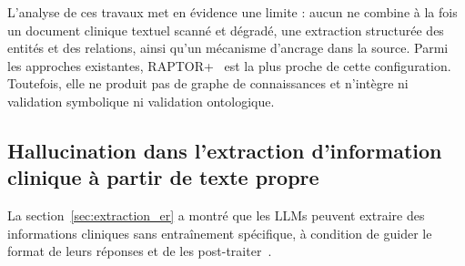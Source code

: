 L'analyse de ces travaux met en évidence une limite : aucun ne combine à la fois un document clinique textuel scanné et dégradé, une extraction structurée des entités et des relations, ainsi qu'un mécanisme d'ancrage dans la source. Parmi les approches existantes, RAPTOR+~\cite{raptorplus2026} est la plus proche de cette configuration. Toutefois, elle ne produit pas de graphe de connaissances et n'intègre ni validation symbolique ni validation ontologique.

\subsection{Hallucination dans l'extraction d'information clinique à partir de texte propre}

La section~\ref{sec:extraction_er} a montré que les LLMs peuvent extraire des informations cliniques sans entraînement spécifique, à condition de guider le format de leurs réponses et de les post-traiter~\cite{agrawal2022fewshot}.

